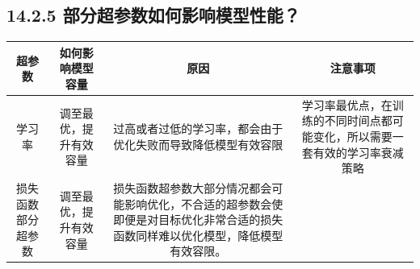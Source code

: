 \subsection{14.2.5
部分超参数如何影响模型性能？}\label{ux90e8ux5206ux8d85ux53c2ux6570ux5982ux4f55ux5f71ux54cdux6a21ux578bux6027ux80fd}

\begin{longtable}[]{@{}cccc@{}}
\toprule
\begin{minipage}[b]{0.10\columnwidth}\centering\strut
超参数\strut
\end{minipage} & \begin{minipage}[b]{0.17\columnwidth}\centering\strut
如何影响模型容量\strut
\end{minipage} & \begin{minipage}[b]{0.31\columnwidth}\centering\strut
原因\strut
\end{minipage} & \begin{minipage}[b]{0.31\columnwidth}\centering\strut
注意事项\strut
\end{minipage}\tabularnewline
\midrule
\endhead
\begin{minipage}[t]{0.10\columnwidth}\centering\strut
学习率\strut
\end{minipage} & \begin{minipage}[t]{0.17\columnwidth}\centering\strut
调至最优，提升有效容量\strut
\end{minipage} & \begin{minipage}[t]{0.31\columnwidth}\centering\strut
过高或者过低的学习率，都会由于优化失败而导致降低模型有效容限\strut
\end{minipage} & \begin{minipage}[t]{0.31\columnwidth}\centering\strut
学习率最优点，在训练的不同时间点都可能变化，所以需要一套有效的学习率衰减策略\strut
\end{minipage}\tabularnewline
\begin{minipage}[t]{0.10\columnwidth}\centering\strut
损失函数部分超参数\strut
\end{minipage} & \begin{minipage}[t]{0.17\columnwidth}\centering\strut
调至最优，提升有效容量\strut
\end{minipage} & \begin{minipage}[t]{0.31\columnwidth}\centering\strut
损失函数超参数大部分情况都会可能影响优化，不合适的超参数会使即便是对目标优化非常合适的损失函数同样难以优化模型，降低模型有效容限。\strut
\end{minipage} & \begin{minipage}[t]{0.31\columnwidth}\centering\strut

\end{minipage}
\end{longtable}
